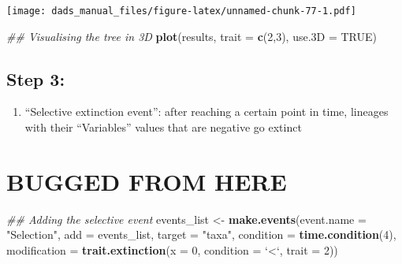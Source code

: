 \documentclass[]{book}
\newenvironment{Shaded}{\begin{snugshade}}{\end{snugshade}}
\newcommand{\CommentTok}[1]{\textcolor[rgb]{0.56,0.35,0.01}{\textit{#1}}}
\newcommand{\DataTypeTok}[1]{\textcolor[rgb]{0.13,0.29,0.53}{#1}}
\newcommand{\DecValTok}[1]{\textcolor[rgb]{0.00,0.00,0.81}{#1}}
\newcommand{\KeywordTok}[1]{\textcolor[rgb]{0.13,0.29,0.53}{\textbf{#1}}}
\newcommand{\NormalTok}[1]{#1}
\newcommand{\OtherTok}[1]{\textcolor[rgb]{0.56,0.35,0.01}{#1}}
\newcommand{\StringTok}[1]{\textcolor[rgb]{0.31,0.60,0.02}{#1}}
\providecommand{\tightlist}{%
  \setlength{\itemsep}{0pt}\setlength{\parskip}{0pt}}
\begin{document}
\texttt{[image: dads\_manual\_files/figure-latex/unnamed-chunk-77-1.pdf]}

\begin{Shaded}
\begin{Highlighting}[]
\CommentTok{## Visualising the tree in 3D}
\KeywordTok{plot}\NormalTok{(results, }\DataTypeTok{trait =} \KeywordTok{c}\NormalTok{(}\DecValTok{2}\NormalTok{,}\DecValTok{3}\NormalTok{), }\DataTypeTok{use.3D =} \OtherTok{TRUE}\NormalTok{)}
\end{Highlighting}
\end{Shaded}

\hypertarget{step-3}{%
\section{Step 3:}\label{step-3}}

\begin{enumerate}
\def\labelenumi{\arabic{enumi}.}
\setcounter{enumi}{2}
\tightlist
\item
  ``Selective extinction event'': after reaching a certain point in time, lineages with their ``Variables'' values that are negative go extinct
\end{enumerate}

\hypertarget{bugged-from-here}{%
\chapter{BUGGED FROM HERE}\label{bugged-from-here}}

\begin{Shaded}
\begin{Highlighting}[]
\CommentTok{## Adding the selective event}
\NormalTok{events_list <-}\StringTok{ }\KeywordTok{make.events}\NormalTok{(}\DataTypeTok{event.name   =} \StringTok{"Selection"}\NormalTok{,}
                           \DataTypeTok{add          =}\NormalTok{ events_list,}
                           \DataTypeTok{target       =} \StringTok{"taxa"}\NormalTok{,}
                           \DataTypeTok{condition    =} \KeywordTok{time.condition}\NormalTok{(}\DecValTok{4}\NormalTok{),}
                           \DataTypeTok{modification =} \KeywordTok{trait.extinction}\NormalTok{(}\DataTypeTok{x =} \DecValTok{0}\NormalTok{, }\DataTypeTok{condition =} \StringTok{`}\DataTypeTok{<}\StringTok{`}\NormalTok{, }\DataTypeTok{trait =} \DecValTok{2}\NormalTok{))}
\end{Highlighting}
\end{Shaded}
\end{document}

